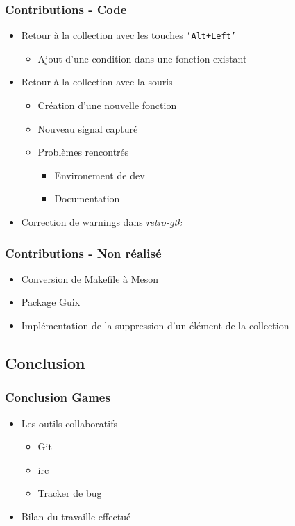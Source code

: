 \documentclass{beamer}
\begin{document}
\begin{frame}
  \frametitle{Contributions - Code}
  \begin{itemize}
  \item Retour à la collection avec les touches \texttt{'Alt+Left'}
    \begin{itemize}
    \item Ajout d'une condition dans une fonction existant
    \end{itemize}
  \item Retour à la collection avec la souris
    \begin{itemize}
    \item Création d'une nouvelle fonction
    \item Nouveau signal capturé
    \item Problèmes rencontrés
      \begin{itemize}
      \item Environement de dev
      \item Documentation
      \end{itemize}
    \end{itemize}
  \item Correction de warnings dans \textit{retro-gtk}
  \end{itemize}
\end{frame}

\begin{frame}
  \frametitle{Contributions - Non réalisé}
  \begin{itemize}
  \item Conversion de Makefile à Meson
  \item Package Guix
  \item Implémentation de la suppression d'un élément de la collection
  \end{itemize}
\end{frame}


\subsection{Conclusion}
\begin{frame}
  \frametitle{Conclusion Games}
  \begin{itemize}
  \item Les outils collaboratifs
    \begin{itemize}
    \item Git 
    \item irc 
    \item Tracker de bug
    \end{itemize}
  \item Bilan du travaille effectué
  \end{itemize}
\end{frame}
\end{document}
